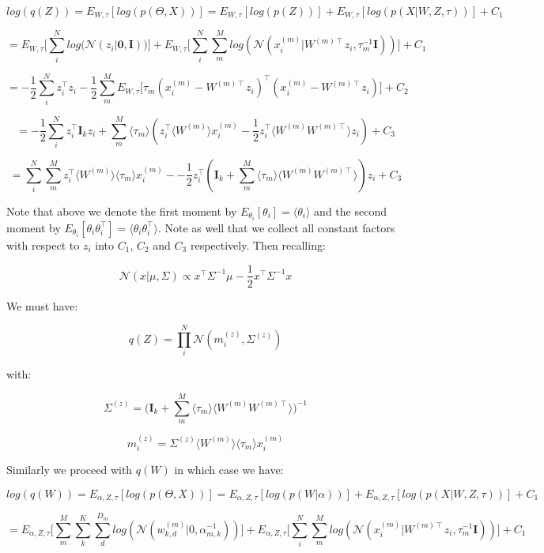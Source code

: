 \documentclass{article}
\begin{document}
	
$$log(q(Z)) = E_{W,\tau}[log(p(\Theta,X))]  = E_{W,\tau}[log(p(Z))] + E_{W,\tau}[log(p(X|W,Z,\tau))] + C_1$$

$$ = E_{W,\tau}\bigg[\sum_i^N{log(\mathcal{N}(z_i|\textbf{0}, \textbf{I})})\bigg] + E_{W,\tau}\bigg[\sum_i^N{\sum_m^M{log(\mathcal{N}(x_i^{(m)}|W^{(m)\intercal}z_i, \tau_m^{-1}\textbf{I}))}}\bigg] + C_1$$

$$ = -\frac{1}{2}\sum_i^N{z_i^\intercal z_i -\frac{1}{2}\sum_m^M{E_{W,\tau}\bigg[\tau_m(x_i^{(m)} - W^{(m)\intercal}z_i)^\intercal(x_i^{(m)} - W^{(m)\intercal}z_i) \bigg]}} + C_2$$

$$ = -\frac{1}{2}\sum_i^N{z_i^\intercal \textbf{I}_k z_i + \sum_m^M{\langle\tau_m\rangle(z_i^\intercal \langle W^{(m)}\rangle x_i^{(m)} -\frac{1}{2} z_i^\intercal \langle W^{(m)}W^{(m)\intercal}\rangle z_i)}} + C_3$$

$$ = \sum_i^N{\sum_m^M{z_i^\intercal \langle W^{(m)}\rangle \langle\tau_m\rangle x_i^{(m)} - -\frac{1}{2}z_i^\intercal (\textbf{I}_k + \sum_m^M{\langle\tau_m\rangle \langle W^{(m)}W^{(m)\intercal}\rangle} )z_i}} + C_3$$

Note that above we denote the first moment by $E_{\theta_i}[\theta_i] = \langle \theta_i \rangle$ and the second moment by $E_{\theta_i}[\theta_i \theta_i^\intercal] = \langle \theta_i \theta_i^\intercal \rangle$. Note as well that we collect all constant factors with respect to $z_i$ into $C_1$, $C_2$ and $C_3$ respectively. Then recalling:

$$\mathcal{N}(x|\mu,\Sigma) \propto x^\intercal \Sigma^{-1} \mu - \frac{1}{2} x^\intercal \Sigma^{-1} x$$

We must have:

$$q(Z) = \prod_i^N{\mathcal{N}(m_i^{(z)},\Sigma^{(z)})}$$

with:

$$\Sigma^{(z)} = \bigg(\textbf{I}_k + \sum_m^M{\langle\tau_m\rangle \langle W^{(m)}W^{(m)\intercal}\rangle} \bigg)^{-1}$$

$$m_i^{(z)} = \Sigma^{(z)} \langle W^{(m)}\rangle \langle\tau_m\rangle x_i^{(m)}$$

\bigskip

Similarly we proceed with $q(W)$ in which case we have:

$$log(q(W)) = E_{\alpha,Z,\tau}[log(p(\Theta,X))] = E_{\alpha,Z,\tau}[log(p(W|\alpha))] + E_{\alpha,Z,\tau}[log(p(X|W,Z,\tau))] + C_1$$

$$=E_{\alpha,Z,\tau}\bigg[\sum_{m}^M{\sum_{k}^K{\sum_{d}^{D_m}{log(\mathcal{N}(w_{k,d}^{(m)}|0, \alpha_{m,k}^{-1}))}}}\bigg] + E_{\alpha,Z,\tau}\bigg[\sum_i^N{\sum_m^M{log(\mathcal{N}(x_i^{(m)}|W^{(m)\intercal}z_i, \tau_m^{-1}\textbf{I}))}}\bigg] + C_1$$
\end{document}
